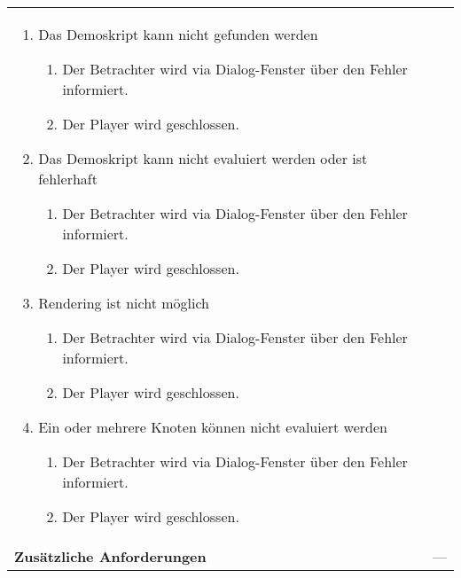 \begin{longtabu}{p{0.5\textwidth}p{0.5\textwidth}}
\begin{enumerate}[label= (\alph*)]
{\begin{enumerate}[label= (\roman*)]
                \end{enumerate}
            }
            \item{Das Demoskript kann nicht gefunden werden
                \begin{enumerate}[label= (\roman*)]
                    \item{Der Betrachter wird via Dialog-Fenster über den Fehler
                            informiert.}
                    \item{Der Player wird geschlossen.}
                \end{enumerate}
            }
            \item{Das Demoskript kann nicht evaluiert werden oder ist fehlerhaft
                \begin{enumerate}[label= (\roman*)]
                    \item{Der Betrachter wird via Dialog-Fenster über den Fehler
                            informiert.}
                    \item{Der Player wird geschlossen.}
                \end{enumerate}
            }
            \item{Rendering ist nicht möglich
                \begin{enumerate}[label= (\roman*)]
                    \item{Der Betrachter wird via Dialog-Fenster über den Fehler
                            informiert.}
                    \item{Der Player wird geschlossen.}
                \end{enumerate}
            }
            \item{Ein oder mehrere Knoten können nicht evaluiert werden
                \begin{enumerate}[label= (\roman*)]
                    \item{Der Betrachter wird via Dialog-Fenster über den Fehler
                            informiert.}
                    \item{Der Player wird geschlossen.}
                \end{enumerate}
            }
        \end{enumerate} \\
    \cmidrule(r){1-1}\cmidrule(lr){2-2}
        \textbf{Zusätzliche Anforderungen} &
        --- \\
    \bottomrule
\end{longtabu}
